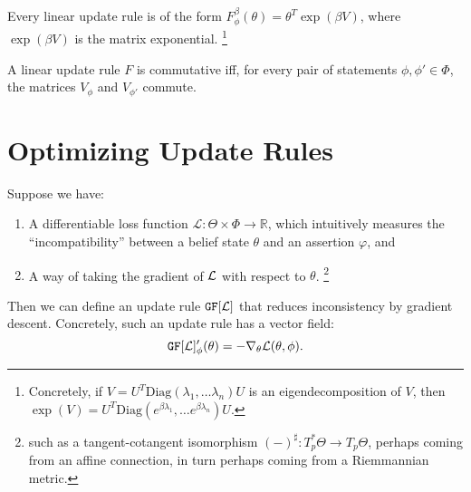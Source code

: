 \documentclass{article}
\begin{document}

\begin{prop}
    Every linear update rule is of the form
    $
        F^{\beta}_\phi(\theta) =  \theta^{T} \exp(\beta V)
    $,
    where $\exp(\beta V)$ is the matrix exponential.%
        \footnote{Concretely, if $V = U^T \mathrm{Diag}(\lambda_1, \ldots \lambda_n) U$ is an eigendecomposition of $V$, then $\exp(V) = U^T \mathrm{Diag}(e^{\beta\lambda_1}, \ldots e^{\beta\lambda_n}) U$.}
\end{prop}

\begin{prop}
    A linear update rule $F$ is commutative iff, for every pair of statements  $\phi, \phi' \in \Phi$, the
    matrices $V_\phi$ and $V_{\phi'}$ commute.
\end{prop}




\section{Optimizing Update Rules}
Suppose we have:
\begin{enumerate}[nosep]
    \item A differentiable loss function $\mathcal L : \Theta \times \Phi  \to \mathbb R$, which intuitively measures the ``incompatibility'' between a belief state $\theta$ and an assertion $\varphi$, and
    \item
        A way of taking the gradient of ${\cal L}$ with respect to $\theta$.%
            \footnote{
            such as a tangent-cotangent isomorphism $(-)^\sharp : T^*_p\Theta \to T_p \Theta$, perhaps coming from an affine connection, in turn perhaps coming from a Riemmannian metric.}
\end{enumerate}
\def\GD#1{\mathtt{GF}[#1]}
\def\NGD#1{\mathtt{NGF}[#1]}

Then we can define an update rule $\GD {\cal L}$ that reduces inconsistency by gradient descent. Concretely, such an update rule has a vector field:
\[
    \GD {\cal L}'_\phi(\theta) = - \nabla_\theta {\cal L}(\theta,\phi).
\]
\end{document}
